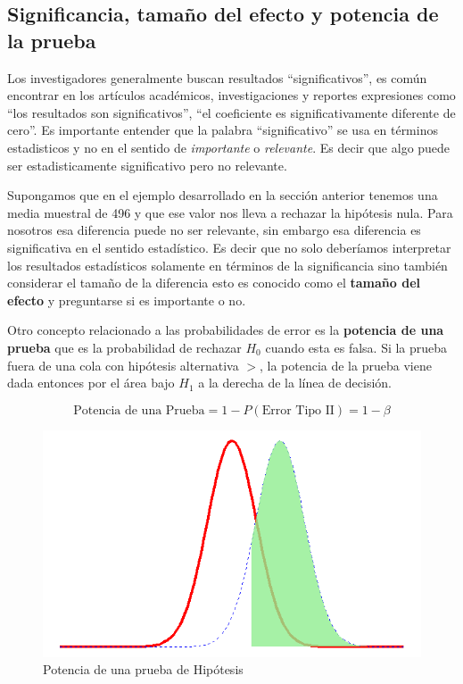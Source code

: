 \documentclass[]{book}
\begin{document}
\hypertarget{significancia-tamano-del-efecto-y-potencia-de-la-prueba}{%
\subsection{Significancia, tamaño del efecto y potencia de la prueba}\label{significancia-tamano-del-efecto-y-potencia-de-la-prueba}}

Los investigadores generalmente buscan resultados ``significativos'', es común encontrar en los artículos académicos, investigaciones y reportes expresiones como ``los resultados son significativos'', ``el coeficiente es significativamente diferente de cero''. Es importante entender que la palabra ``significativo'' se usa en términos estadisticos y no en el sentido de \emph{importante} o \emph{relevante}. Es decir que algo puede ser estadisticamente significativo pero no relevante.

Supongamos que en el ejemplo desarrollado en la sección anterior tenemos una media muestral de 496 y que ese valor nos lleva a rechazar la hipótesis nula. Para nosotros esa diferencia puede no ser relevante, sin embargo esa diferencia es significativa en el sentido estadístico. Es decir que no solo deberíamos interpretar los resultados estadísticos solamente en términos de la significancia sino también considerar el tamaño de la diferencia esto es conocido como el \textbf{tamaño del efecto} y preguntarse si es importante o no.

Otro concepto relacionado a las probabilidades de error es la \textbf{potencia de una prueba} que es la probabilidad de rechazar \(H_0\) cuando esta es falsa. Si la prueba fuera de una cola con hipótesis alternativa \(>\), la potencia de la prueba viene dada entonces por el área bajo \(H_1\) a la derecha de la línea de decisión.

\begin{equation} 
\text{Potencia de una Prueba}=1-P\left(\text{Error Tipo II}\right)=1-\beta
\label{eq:power}
\end{equation}

\begin{figure}[h!]

{\centering \includegraphics[width=0.6\linewidth]{power} 

}

\caption{Potencia de una prueba de Hipótesis}\label{fig:power}
\end{figure}
\end{document}
